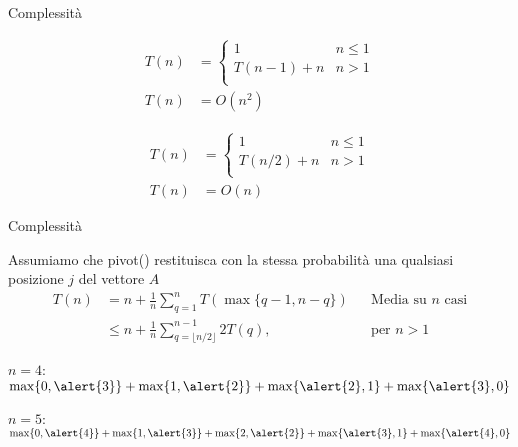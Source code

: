 \begin{frame}{Complessità}

\vspace{-9pt}
\begin{myboxtitle}
\begin{align*}
  T(n) &= \begin{cases}
    1 & n \leq 1 \\
    T(n-1) + n & n>1 \\
  \end{cases} \\
  T(n) &= O(n^2)
\end{align*}  
\end{myboxtitle}

\begin{myboxtitle}
\begin{align*}
  T(n) &= \begin{cases}
    1 & n \leq 1 \\
    T(n/2) + n & n>1 \\
  \end{cases} \\
  T(n) &= O(n)
\end{align*}  
\end{myboxtitle}




\end{frame}

\begin{frame}{Complessità}

\vspace{-9pt}
\begin{myboxtitle}
Assumiamo che \textsf{pivot}() restituisca con la stessa probabilità una qualsiasi posizione $j$ del vettore $A$
\begin{align*}
T(n) &= n + \frac{1}{n}\sum_{q=1}^{n} T\left(\max\{q-1, n-q\}\right)&&\textrm{Media su $n$  casi}\\
     &\le n + \frac{1}{n} \sum_{q=\lfloor n/2\rfloor}^{n-1} 2T(q), &&\textrm{per $n > 1$}
\end{align*}
\end{myboxtitle}

\begin{myboxtitle}[Esempi ]
\small
\BIL
\item $n=4$:
$\max\{0, \alert{3} \} +
\max\{1, \alert{2} \} +
\max\{\alert{2}, 1 \} +
\max\{\alert{3}, 0 \}$
\item $n=5$:
$\max\{0, \alert{4} \}+
\max\{1, \alert{3} \}+
\max\{2, \alert{2} \}+
\max\{\alert{3}, 1 \}+
\max\{\alert{4}, 0 \}$
\EIL
\end{myboxtitle}

\end{frame}

